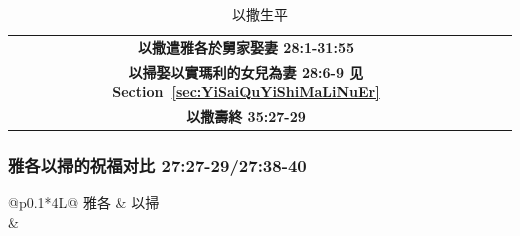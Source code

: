 \begin{table}[!hbp]
\begin{threeparttable}
\begin{tabular}{c c c}
\multicolumn{1}{L{\dimexpr0.5\linewidth-1\tabcolsep\relax}}{\bfseries 以撒遣雅各於舅家娶妻 28:1-31:55}  
& \multicolumn{1}{L{\dimexpr0.2\linewidth-1\tabcolsep\relax}}{\bfseries }
& \multicolumn{1}{L{\dimexpr0.1\linewidth-1\tabcolsep\relax}}{\bfseries }\\ 

\multicolumn{1}{L{\dimexpr0.5\linewidth-1\tabcolsep\relax}}{\bfseries 以掃娶以實瑪利的女兒為妻 28:6-9 见Section~\ref{sec:YiSaiQuYiShiMaLiNuEr}}  
& \multicolumn{1}{L{\dimexpr0.2\linewidth-1\tabcolsep\relax}}{\bfseries }
& \multicolumn{1}{L{\dimexpr0.1\linewidth-1\tabcolsep\relax}}{\bfseries }\\ 

\multicolumn{1}{L{\dimexpr0.5\linewidth-1\tabcolsep\relax}}{\bfseries 以撒壽終 35:27-29}  
& \multicolumn{1}{L{\dimexpr0.2\linewidth-1\tabcolsep\relax}}{\bfseries }
& \multicolumn{1}{L{\dimexpr0.1\linewidth-1\tabcolsep\relax}}{\bfseries }\\ \hline

\end{tabular}
\caption{以撒生平}
\label{table:YiSaShengPing}
\end{threeparttable}
\end{table}


\subsubsection{雅各以掃的祝福对比 27:27-29/27:38-40}
\begin{table}[!hbp]
\begin{threeparttable}
\begin{tabular}{@{}p{}*{4}{L{\tabcolsep\relax}}@{}}
\toprule
   雅各 & 以掃            \\\hline
{}  
& \\\hline
\end{tabular}
\caption{以撒給兒子們的祝福}
\label{table:IsaacSons}
\end{threeparttable}
\end{table}

